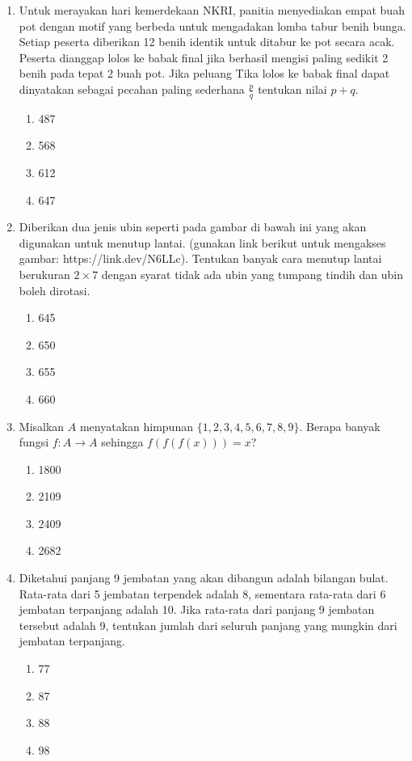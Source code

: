 \documentclass[12pt]{scrartcl}
\begin{document}
\begin{enumerate}
    \item Untuk merayakan hari kemerdekaan NKRI, panitia menyediakan empat buah pot dengan motif yang berbeda untuk mengadakan lomba tabur benih bunga. Setiap peserta diberikan 12 benih identik untuk ditabur ke pot secara acak. Peserta dianggap lolos ke babak final jika berhasil mengisi paling sedikit 2 benih pada tepat 2 buah pot. Jika peluang Tika lolos ke babak final dapat dinyatakan sebagai pecahan paling sederhana $\frac{p}{q}$ tentukan nilai $p+q$.
    \begin{enumerate}
        \item 487
        \item 568
        \item 612
        \item 647
    \end{enumerate}

    \item Diberikan dua jenis ubin seperti pada gambar di bawah ini yang akan digunakan untuk menutup lantai. (gunakan link berikut untuk mengakses gambar: https://link.dev/N6LLc). Tentukan banyak cara menutup lantai berukuran $2\times7$ dengan syarat tidak ada ubin yang tumpang tindih dan ubin boleh dirotasi.
    \begin{enumerate}
        \item 645
        \item 650
        \item 655
        \item 660
    \end{enumerate}

    \item Misalkan $A$ menyatakan himpunan $\{1,2,3,4,5,6,7,8,9\}$. Berapa banyak fungsi $f:A\rightarrow A$ sehingga $f(f(f(x)))=x$?
    \begin{enumerate}
        \item 1800
        \item 2109
        \item 2409
        \item 2682
    \end{enumerate}

    \item Diketahui panjang 9 jembatan yang akan dibangun adalah bilangan bulat. Rata-rata dari 5 jembatan terpendek adalah 8, sementara rata-rata dari 6 jembatan terpanjang adalah 10. Jika rata-rata dari panjang 9 jembatan tersebut adalah 9, tentukan jumlah dari seluruh panjang yang mungkin dari jembatan terpanjang.
    \begin{enumerate}
        \item 77
        \item 87
        \item 88
        \item 98
    \end{enumerate}

\end{enumerate}
\end{document}
